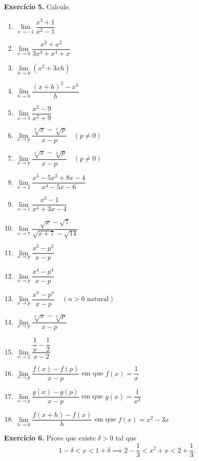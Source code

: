 \documentclass[12pt,a4paper]{article}
\begin{document}
\vspace{0.5cm}
\noindent\textbf{Exercício 5.} Calcule.
\begin{enumerate}
    \renewcommand{\theenumi}{\alph{enumi}}
    \renewcommand{\labelenumi}{\theenumi)}
    \item $\lim\limits_{x \to -1} \dfrac{x^3 + 1}{x^2 - 1}$
    \item $\lim\limits_{x \to 0} \dfrac{x^3 + x^2}{3x^3 + x^4 + x}$
    \item $\lim\limits_{h \to 0} (x^2 + 3xh)$
    \item $\lim\limits_{h \to 0} \dfrac{(x + h)^3 - x^3}{h}$
    \item $\lim\limits_{x \to 3} \dfrac{x^2 - 9}{x^2 + 9}$
    \item $\lim\limits_{x \to p} \dfrac{\sqrt[3]{x} - \sqrt[3]{p}}{x - p} \quad (p \neq 0)$
    \item $\lim\limits_{x \to p} \dfrac{\sqrt[4]{x} - \sqrt[4]{p}}{x - p} \quad (p \neq 0)$
    \item $\lim\limits_{x \to 2} \dfrac{x^3 - 5x^2 + 8x - 4}{x^4 - 5x - 6}$
    \item $\lim\limits_{x \to 1} \dfrac{x^3 - 1}{x^4 + 3x - 4}$
    \item $\lim\limits_{x \to 7} \dfrac{\sqrt{x} - \sqrt{7}}{\sqrt{x + 7} - \sqrt{14}}$
    \item $\lim\limits_{x \to p} \dfrac{x^3 - p^3}{x - p}$
    \item $\lim\limits_{x \to p} \dfrac{x^4 - p^4}{x - p}$
    \item $\lim\limits_{x \to p} \dfrac{x^n - p^n}{x - p} \quad (n > 0 \text{ natural})$
    \item $\lim\limits_{x \to p} \dfrac{\sqrt[n]{x} - \sqrt[n]{p}}{x - p}$
    \item $\lim\limits_{x \to 2} \dfrac{\dfrac{1}{x} - \dfrac{1}{2}}{x - 2}$
    \item $\lim\limits_{x \to p} \dfrac{f(x) - f(p)}{x - p}$ em que $f(x) = \dfrac{1}{x}$
    \item $\lim\limits_{x \to p} \dfrac{g(x) - g(p)}{x - p}$ em que $g(x) = \dfrac{1}{x^2}$
    \item $\lim\limits_{h \to 0} \dfrac{f(x + h) - f(x)}{h}$ em que $f(x) = x^2 - 3x$
\end{enumerate}

\vspace{0.5cm}
\noindent\textbf{Exercício 6.}
Prove que existe $\delta > 0$ tal que
\[
1 - \delta < x < 1 + \delta \implies 2 - \dfrac{1}{3} < x^2 + x < 2 + \dfrac{1}{3}.
\]
\end{document}
